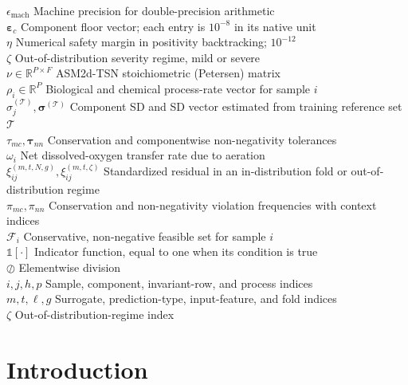 \documentclass[a4paper,fleqn]{cas-sc}
\newcommand{\csvcomma}{,}
\begin{document}
\begin{tabbing}
$\epsilon_{\mathrm{mach}}$ \> Machine precision for double-precision arithmetic \\
$\boldsymbol{\varepsilon}_c$ \> Component floor vector; each entry is $10^{-8}$ in its native unit \\
$\eta$ \> Numerical safety margin in positivity backtracking; $10^{-12}$ \\
$\zeta$ \> Out-of-distribution severity regime\csvcomma{} mild or severe \\
$\nu\in\mathbb{R}^{P\times F}$ \> ASM2d-TSN stoichiometric (Petersen) matrix \\
$\rho_i\in\mathbb{R}^{P}$ \> Biological and chemical process-rate vector for sample $i$ \\
$\sigma_j^{(\mathcal{T})}\csvcomma{}\boldsymbol{\sigma}^{(\mathcal{T})}$ \> Component SD and SD vector estimated from training reference set $\mathcal{T}$ \\
$\tau_{mc}\csvcomma{}\boldsymbol{\tau}_{nn}$ \> Conservation and componentwise non-negativity tolerances \\
$\omega_i$ \> Net dissolved-oxygen transfer rate due to aeration \\
$\xi_{ij}^{(m\csvcomma{}t\csvcomma{}N\csvcomma{}g)}\csvcomma{}\xi_{ij}^{(m\csvcomma{}t\csvcomma{}\zeta)}$ \> Standardized residual in an in-distribution fold or out-of-distribution regime \\
$\pi_{mc}\csvcomma{}\pi_{nn}$ \> Conservation and non-negativity violation frequencies with context indices \\
$\mathcal{F}_i$ \> Conservative\csvcomma{} non-negative feasible set for sample $i$ \\
$\mathbb{1}[\cdot]$ \> Indicator function\csvcomma{} equal to one when its condition is true \\
$\oslash$ \> Elementwise division \\
$i\csvcomma{}j\csvcomma{}h\csvcomma{}p$ \> Sample\csvcomma{} component\csvcomma{} invariant-row\csvcomma{} and process indices \\
$m\csvcomma{}t\csvcomma{}\ell\csvcomma{}g$ \> Surrogate\csvcomma{} prediction-type\csvcomma{} input-feature\csvcomma{} and fold indices \\
$\zeta$ \> Out-of-distribution-regime index \\
\end{tabbing}

\section{Introduction}
\end{document}
